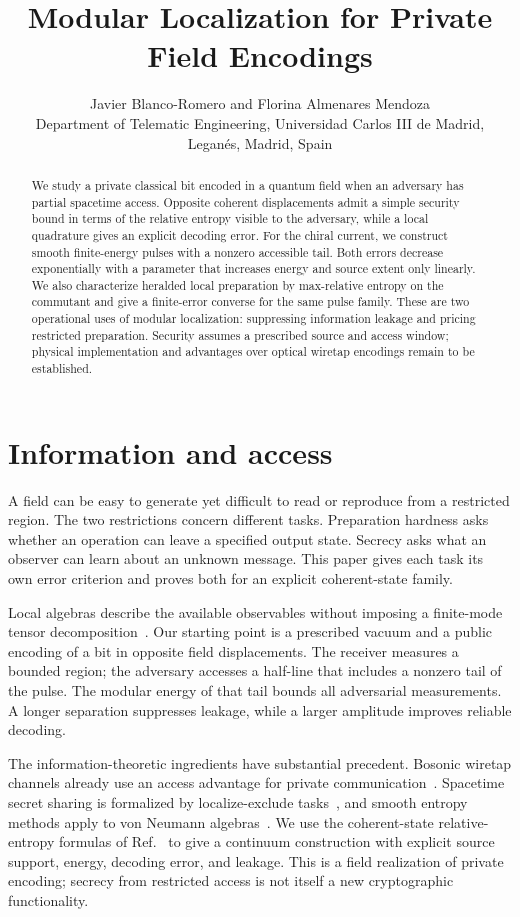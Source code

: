 \documentclass[11pt,a4paper]{article}
\title{Modular Localization for Private Field Encodings}
\author{Javier Blanco-Romero and Florina Almenares Mendoza\\\small Department of Telematic Engineering, Universidad Carlos III de Madrid,\\Legan\'es, Madrid, Spain}
\date{}
\begin{document}
\maketitle
\begin{abstract}
We study a private classical bit encoded in a quantum field when an
adversary has partial spacetime access. Opposite coherent displacements
admit a simple security bound in terms of the relative entropy visible to
the adversary, while a local quadrature gives an explicit decoding error.
For the chiral current, we construct smooth finite-energy pulses with a
nonzero accessible tail. Both errors decrease exponentially with a parameter
that increases energy and source extent only linearly. We also characterize
heralded local preparation by max-relative entropy on the commutant and give
a finite-error converse for the same pulse family. These are two operational
uses of modular localization: suppressing information leakage and pricing
restricted preparation. Security assumes a prescribed source and access
window; physical implementation and advantages over optical wiretap
encodings remain to be established.
\end{abstract}

\section{Information and access}

A field can be easy to generate yet difficult to read or reproduce from a
restricted region. The two restrictions concern different tasks.
Preparation hardness asks whether an operation can leave a specified output
state. Secrecy asks what an observer can learn about an unknown message.
This paper gives each task its own error criterion and proves both for an
explicit coherent-state family.

Local algebras describe the available observables without imposing a
finite-mode tensor decomposition~\cite{haag1964algebraic,witten2018aps}.
Our starting point is a prescribed vacuum and a public encoding of a bit in
opposite field displacements. The receiver measures a bounded region; the
adversary accesses a half-line that includes a nonzero tail of the pulse.
The modular energy of that tail bounds all adversarial measurements.
A longer separation suppresses leakage, while a larger amplitude improves
reliable decoding.

The information-theoretic ingredients have substantial precedent. Bosonic
wiretap channels already use an access advantage for private
communication~\cite{wang2012private}. Spacetime secret sharing is formalized
by localize-exclude tasks~\cite{hayden2019localizing}, and smooth entropy
methods apply to von Neumann algebras~\cite{berta2016smooth}. We use the
coherent-state relative-entropy formulas of
Ref.~\cite{bostelmann2022relative} to give a continuum construction with
explicit source support, energy, decoding error, and leakage. This is a
field realization of private encoding; secrecy from restricted access is
not itself a new cryptographic functionality.
\end{document}
